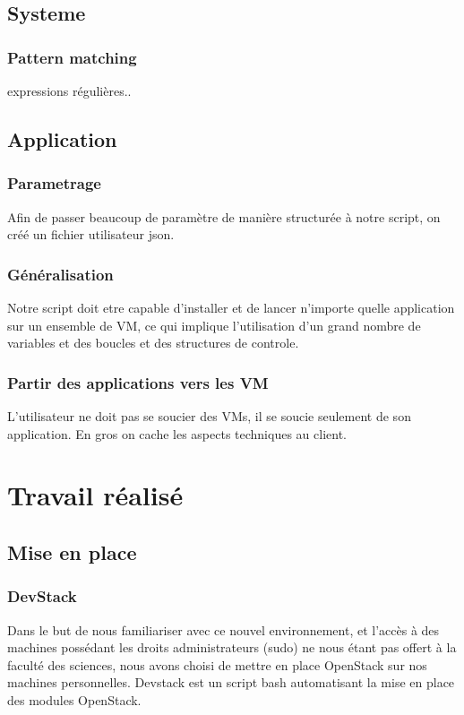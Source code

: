\documentclass{report}
\begin{document}
    \section{Systeme}
        \subsection{Pattern matching}
            expressions régulières.. 
            
    \section{Application}
        \subsection{Parametrage}
                Afin de passer beaucoup de paramètre de manière structurée à notre script, on créé un fichier utilisateur json.
        \subsection{Généralisation}
                Notre script doit etre capable d'installer et de lancer n'importe quelle application sur un ensemble de VM, ce qui implique
                l'utilisation d'un grand nombre de variables et des boucles et des structures de controle.
        \subsection{Partir des applications vers les VM}
                L'utilisateur ne doit pas se soucier des VMs, il se soucie seulement de son application. En gros on cache les aspects techniques au client.\break
        






\chapter{Travail réalisé}
    \section{Mise en place}
        \subsection{DevStack}
            Dans le but de nous familiariser avec ce nouvel environnement,
            et l'accès à des machines possédant les droits administrateurs (sudo)
            ne nous étant pas offert à la faculté des sciences,
            nous avons choisi de mettre en place OpenStack sur nos machines personnelles.\break
            Devstack est un script bash automatisant la mise en place des modules OpenStack.
\end{document}
